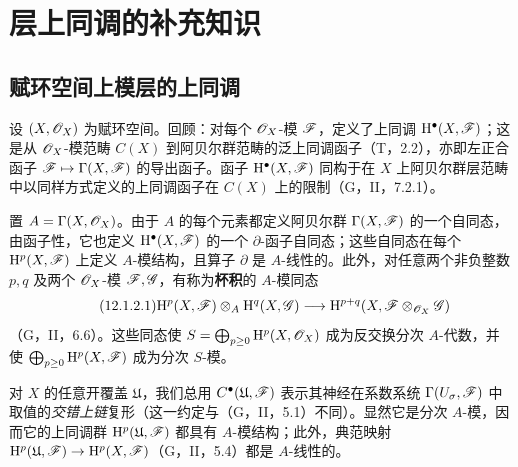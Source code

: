 \section{层上同调的补充知识}
\subsection{赋环空间上模层的上同调}
设 $(X,\mathscr O_X)$ 为赋环空间。回顾：对每个 $\mathscr O_X$-模 $\mathscr F$，定义了上同调 $\mathrm H^\bullet(X,\mathscr F)$；这是从 $\mathscr O_X$-模范畴 $C(X)$ 到阿贝尔群范畴的泛上同调函子（T，2.2），亦即左正合函子 $\mathscr F\mapsto\Gamma(X,\mathscr F)$ 的导出函子。函子 $\mathrm H^\bullet(X,\mathscr F)$ 同构于在 $X$ 上阿贝尔群层范畴中以同样方式定义的上同调函子在 $C(X)$ 上的限制（G，II，7.2.1）。

置 $A=\Gamma(X,\mathscr O_X)$。由于 $A$ 的每个元素都定义阿贝尔群 $\Gamma(X,\mathscr F)$ 的一个自同态，由函子性，它也定义 $\mathrm H^\bullet(X,\mathscr F)$ 的一个 $\partial$-函子自同态；这些自同态在每个 $\mathrm H^p(X,\mathscr F)$ 上定义 $A$-模结构，且算子 $\partial$ 是 $A$-线性的。此外，对任意两个非负整数 $p,q$ 及两个 $\mathscr O_X$-模 $\mathscr F,\mathscr G$，有称为\textbf{杯积}的 $A$-模同态
\begin{equation}\tag{12.1.2.1}
\mathrm H^p(X,\mathscr F)\otimes_A\mathrm H^q(X,\mathscr G)
\longrightarrow\mathrm H^{p+q}(X,\mathscr F\otimes_{\mathscr O_X}\mathscr G)
\end{equation}
（G，II，6.6）。这些同态使 $S=\bigoplus_{p\geq0}\mathrm H^p(X,\mathscr O_X)$ 成为反交换分次 $A$-代数，并使 $\bigoplus_{p\geq0}\mathrm H^p(X,\mathscr F)$ 成为分次 $S$-模。

对 $X$ 的任意开覆盖 $\mathfrak U$，我们总用 $C^\bullet(\mathfrak U,\mathscr F)$ 表示其神经在系数系统 $\Gamma(U_\sigma,\mathscr F)$ 中取值的\emph{交错上链}复形（这一约定与（G，II，5.1）不同）。显然它是分次 $A$-模，因而它的上同调群 $\mathrm H^p(\mathfrak U,\mathscr F)$ 都具有 $A$-模结构；此外，典范映射 $\mathrm H^p(\mathfrak U,\mathscr F)\to\mathrm H^p(X,\mathscr F)$（G，II，5.4）都是 $A$-线性的。

